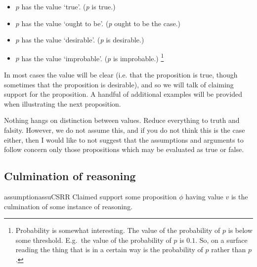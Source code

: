 \begin{note}
    \begin{itemize}
  \item \(p\) has the value `true'. \hfill (\emph{p} is true.)
  \item \(p\) has the value `ought to be'. \hfill (\emph{p} ought to be the case.)
  \item \(p\) has the value `desirable'. \hfill (\emph{p} is desirable.)
  \item \(p\) has the value `improbable'. \hfill (\emph{p} is improbable.)\nolinebreak
    \footnote{
      Probability is somewhat interesting.
      The value of the probability of \(p\) is below some threshold.
      E.g.\ the value of the probability of \(p\) is \(0.1\).
      So, on a surface reading the thing that is in a certain way is the probability of \(p\) rather than \(p\).
    }
  \end{itemize}
\end{note}


\begin{note}
In most cases the value will be clear (i.e. that the proposition is true, though sometimes that the proposition is desirable), and so we will talk of claiming support for the proposition.
  A handful of additional examples will be provided when illustrating the next proposition.
\end{note}


\begin{note}
  Nothing hangs on distinction between values.
  Reduce everything to truth and falsity.
  However, we do not assume this, and if you do not think this is the case either, then I would like to not suggest that the assumptions and arguments to follow concern only those propositions which may be evaluated as true or false.
\end{note}

\subsection{Culmination of reasoning}

\begin{note}
  \begin{restatable}{assumption}{assuCSRR}\label{assu:CS-culmination-of-R}
    Claimed support some proposition \(\phi\) having value \(v\) is the culmination of some instance of reasoning.
  \end{restatable}
\end{note}

